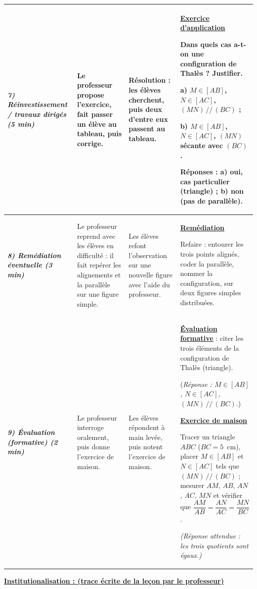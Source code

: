 \documentclass[10pt]{article}
\newcommand{\titreR}[1]{\underline{\textcolor{rougetitre}{\bfseries #1}}}
\newcommand{\app}{\titreR{Exercice d'application}}
\newcommand{\maison}{\underline{\textcolor{rougemaison}{\bfseries Exercice de maison}}}
\newcommand{\moment}[1]{\textbf{\itshape #1}}
\begin{document}
\begin{longtable}{|p{2.35cm}|p{5.35cm}|p{4.55cm}|p{13.85cm}|}
\moment{7) Réinvestissement / travaux dirigés (5 min)} &
Le professeur propose l'exercice, fait passer un élève au tableau, puis corrige. &
\textbf{Résolution} : les élèves cherchent, puis deux d'entre eux passent au tableau. &
\app \par
Dans quels cas a-t-on une configuration de Thalès ? Justifier. \par
a) $M\in[AB]$, $N\in[AC]$, $(MN)\,//\,(BC)$ ; \par
b) $M\in[AB]$, $N\in[AC]$, $(MN)$ sécante avec $(BC)$. \par
\textbf{Réponses :} a) oui, cas particulier (triangle) ; b) non (pas de parallèle). \\ \hline

\moment{8) Remédiation éventuelle (3 min)} &
Le professeur reprend avec les élèves en difficulté : il fait repérer les alignements et la parallèle sur une figure simple. &
Les élèves refont  l'observation sur une nouvelle figure avec l'aide du professeur. &
\titreR{Remédiation} \par
Refaire : entourer les trois points alignés, coder la parallèle, nommer la
configuration, sur deux figures simples distribuées. \\ \hline

\moment{9) Évaluation (formative) (2 min)} &
Le professeur interroge oralement, puis donne l'exercice de maison. &
Les élèves répondent à main levée, puis notent l'exercice de maison. &
\titreR{Évaluation formative} : citer les trois éléments de la configuration de
Thalès (triangle). \par
(\textit{Réponse : $M\in[AB]$, $N\in[AC]$, $(MN)\,//\,(BC)$}.) \par
\maison \par
Tracer un triangle $ABC$ ($BC=5$~cm), placer $M\in[AB]$ et $N\in[AC]$ tels que
$(MN)\,//\,(BC)$ ; mesurer $AM$, $AB$, $AN$, $AC$, $MN$ et vérifier que
$\dfrac{AM}{AB}=\dfrac{AN}{AC}=\dfrac{MN}{BC}$. \par
\textit{(Réponse attendue : les trois quotients sont égaux.)} \\ \hline
\end{longtable}

\begin{center}
\underline{\textcolor{rougetitre}{\large\bfseries Institutionalisation \; : \; (trace écrite de la leçon par le professeur)}}
\end{center}
\end{document}
